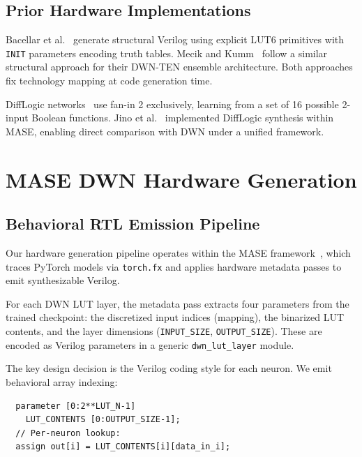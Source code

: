\documentclass[conference]{IEEEtran}
\begin{document}
\subsection{Prior Hardware Implementations}

Bacellar et al.~\cite{bacellar2024dwn} generate structural Verilog using explicit LUT6 primitives with \texttt{INIT} parameters encoding truth tables.
Mecik and Kumm~\cite{mecik2025dwnten} follow a similar structural approach for their DWN-TEN ensemble architecture.
Both approaches fix technology mapping at code generation time.

DiffLogic networks~\cite{petersen2022difflogic} use fan-in 2 exclusively, learning from a set of 16 possible 2-input Boolean functions.
Jino et al.~\cite{jino2024difflogic} implemented DiffLogic synthesis within MASE, enabling direct comparison with DWN under a unified framework.


\section{MASE DWN Hardware Generation}
\label{sec:method}

\subsection{Behavioral RTL Emission Pipeline}

Our hardware generation pipeline operates within the MASE framework~\cite{mase2024}, which traces PyTorch models via \texttt{torch.fx} and applies hardware metadata passes to emit synthesizable Verilog.

For each DWN LUT layer, the metadata pass extracts four parameters from the trained checkpoint: the discretized input indices (mapping), the binarized LUT contents, and the layer dimensions (\texttt{INPUT\_SIZE}, \texttt{OUTPUT\_SIZE}).
These are encoded as Verilog parameters in a generic \texttt{dwn\_lut\_layer} module.

The key design decision is the Verilog coding style for each neuron.
We emit behavioral array indexing:

\begin{verbatim}
  parameter [0:2**LUT_N-1]
    LUT_CONTENTS [0:OUTPUT_SIZE-1];
  // Per-neuron lookup:
  assign out[i] = LUT_CONTENTS[i][data_in_i];
\end{verbatim}
\end{document}
